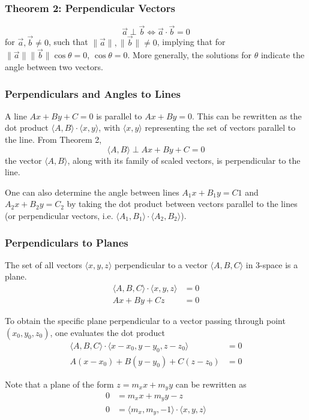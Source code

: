\documentclass{article}
\newcommand{\vect}[1]{\ensuremath{\overrightarrow{#1}}}
\newcommand{\magnitude}[1]{\ensuremath{\lVert #1 \rVert}}
\newcommand{\magvect}[1]{\magnitude{\vect{#1}}}
\begin{document}
\subsubsection{Theorem 2: Perpendicular Vectors}
$$\vect{a} \perp \vect{b} \iff \vect{a} \cdot \vect{b} = 0$$ for $\vect{a}, \vect{b} \ne 0$, such that $\magvect{a}, \magvect{b} \ne 0$, implying that for $\magvect{a}\magvect{b}\cos{\theta} = 0$, $\cos{\theta} = 0$. More generally, the solutions for $\theta$ indicate the angle between two vectors.

\subsubsection{Perpendiculars and Angles to Lines}
A line $Ax + By + C = 0$ is parallel to $Ax + By = 0$. This can be rewritten as the dot product $\langle A, B \rangle \cdot \langle x, y \rangle$, with $\langle x, y \rangle$ representing the set of vectors parallel to the line. From Theorem 2,
$$\langle A, B \rangle \perp Ax + By + C = 0$$
the vector $\langle A, B \rangle$, along with its family of scaled vectors, is perpendicular to the line.

One can also determine the angle between lines $A_1x + B_1y = C1$ and $A_2x + B_2y = C_2$ by taking the dot product between vectors parallel to the lines (or perpendicular vectors, i.e. $\langle A_1, B_1 \rangle \cdot \langle A_2, B_2 \rangle$).

\subsubsection{Perpendiculars to Planes}
The set of all vectors $\langle x, y, z \rangle$ perpendicular to a vector $\langle A, B, C \rangle$ in 3-space is a plane.
\begin{align*}
    \langle A, B, C \rangle \cdot \langle x, y, z \rangle &= 0 \\
    Ax + By + Cz &= 0
\end{align*}

To obtain the specific plane perpendicular to a vector passing through point $(x_0, y_0, z_0)$, one evaluates the dot product
\begin{align*}
    \langle A, B, C \rangle \cdot \langle x - x_0, y - y_0, z - z_0 \rangle &= 0 \\
    A\left(x - x_0\right) + B\left(y - y_0\right) + C\left(z - z_0\right) &= 0
\end{align*}

Note that a plane of the form $z = m_xx + m_yy$ can be rewritten as
\begin{align*}
    0 &= m_xx + m_yy - z \\
    0 &= \langle m_x, m_y, -1 \rangle \cdot \langle x, y, z \rangle
\end{align*}
\end{document}
